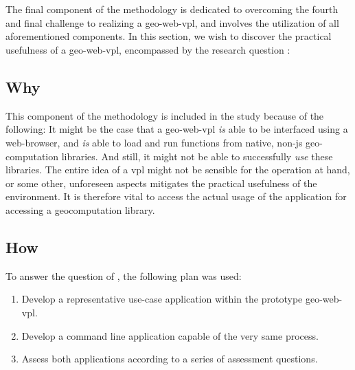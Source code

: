 
\section{\mySubRQFourTitle} 
\label{sec:method-four}

The final component of the methodology is dedicated to overcoming the fourth and final challenge to realizing a \ac{geo-web-vpl}, and involves the utilization of all aforementioned components. 
In this section, we wish to discover the practical usefulness of a \ac{geo-web-vpl}, encompassed by the research question : \mySubRQFour


\subsection*{Why}
This component of the methodology is included in the study because of the following: 
It might be the case that a geo-web-vpl \emph{is} able to be interfaced using a web-browser, and \emph{is} able to load and run functions from native, non-js geo-computation libraries. 
And still, it might not be able to successfully \emph{use} these libraries. 
The entire idea of a vpl might not be sensible for the operation at hand, or some other, unforeseen aspects mitigates the practical usefulness of the environment. 
It is therefore vital to access the actual usage of the application for accessing a geocomputation library.

\subsection*{How}
To answer the question of \mySubRQFourTitle, the following plan was used: 
\begin{enumerate}[-]
  \item Develop a representative use-case application within the prototype \ac{geo-web-vpl}.
  \item Develop a command line application capable of the very same process.
  \item Assess both applications according to a series of assessment questions.
\end{enumerate}

